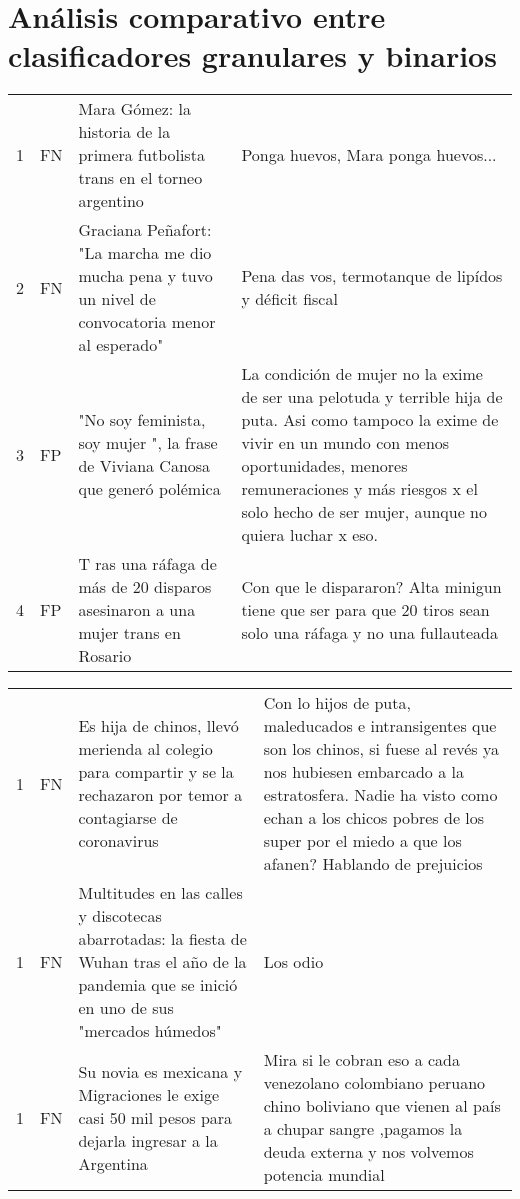 


\section{Análisis comparativo entre clasificadores granulares y binarios}


\begin{table}[ht!]
    \centering
    \footnotesize
    \begin{tabular}{p{} p{} p{} p{}}
        \hline
        1 & FN & Mara Gómez: la historia de la primera futbolista trans en el torneo argentino & Ponga huevos, Mara ponga huevos... \\
        2 & FN & Graciana Peñafort: "La marcha me dio mucha pena y tuvo un nivel de convocatoria menor al esperado" & Pena das vos, termotanque de lipídos y déficit fiscal \\
        3 & FP & "No soy feminista, soy mujer ", la frase de Viviana Canosa que generó polémica & La condición de mujer no la exime de ser una pelotuda y terrible hija de puta. Asi como tampoco la exime de vivir en un mundo con menos oportunidades, menores remuneraciones y más riesgos x el solo hecho de ser mujer, aunque no quiera luchar x eso. \\
        4 & FP & T ras una ráfaga de más de 20 disparos asesinaron a una mujer trans en Rosario & Con que le dispararon? Alta minigun tiene que ser para que 20 tiros sean solo una ráfaga y no una fullauteada \\
    \end{tabular}
    \begin{tabular}{p{} p{} p{} p{}}
        1 & FN & Es hija de chinos, llevó merienda al colegio para compartir y se la rechazaron por temor a contagiarse de coronavirus &  Con lo hijos de puta, maleducados e intransigentes que son los chinos, si fuese al revés ya nos hubiesen embarcado a la estratosfera. Nadie ha visto como echan a los chicos pobres de los super por el miedo a que los afanen? Hablando de prejuicios \\
        1 & FN & Multitudes en las calles y discotecas abarrotadas: la fiesta de Wuhan tras el año de la pandemia que se inició en uno de sus "mercados húmedos" &  Los odio \\
        1 & FN & Su novia es mexicana y Migraciones le exige casi 50 mil pesos para dejarla ingresar a la Argentina &  Mira si le cobran eso a cada venezolano colombiano peruano chino boliviano que vienen al país a chupar sangre ,pagamos la deuda externa y nos volvemos potencia mundial \\

\end{tabular}
\end{table}
